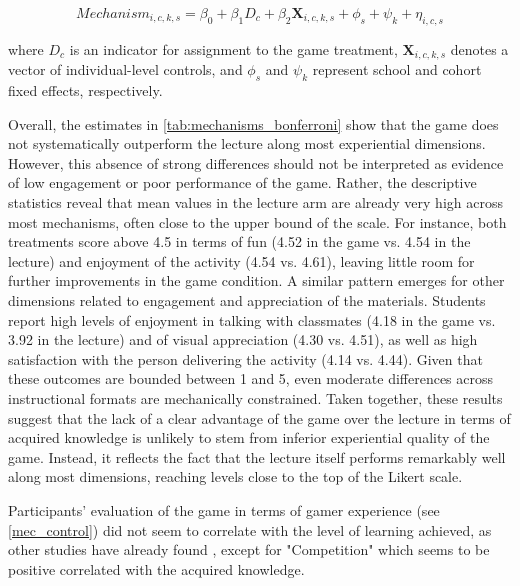 \documentclass[preprint,12pt]{elsarticle}
\begin{document}
\[ Mechanism_{i,c,k,s} = \beta_0 + \beta_1 D_c + \beta_2\textbf{X}_{i,c,k,s} + \phi_s + \psi_k + \eta_{i,c,s} \]

where $D_c$ is an indicator for assignment to the game treatment, $\mathbf{X}_{i,c,k,s}$ denotes a vector of individual-level controls, and $\phi_s$ and $\psi_k$ represent school and cohort fixed effects, respectively.



Overall, the estimates in \ref{tab:mechanisms_bonferroni} show that the game does not systematically outperform the lecture along most experiential dimensions. However, this absence of strong differences should not be interpreted as evidence of low engagement or poor performance of the game. Rather, the descriptive statistics reveal that mean values in the lecture arm are already very high across most mechanisms, often close to the upper bound of the scale. For instance, both treatments score above 4.5 in terms of fun (4.52 in the game vs. 4.54 in the lecture) and enjoyment of the activity (4.54 vs. 4.61), leaving little room for further improvements in the game condition.
A similar pattern emerges for other dimensions related to engagement and appreciation of the materials. Students report high levels of enjoyment in talking with classmates (4.18 in the game vs. 3.92 in the lecture) and of visual appreciation (4.30 vs. 4.51), as well as high satisfaction with the person delivering the activity (4.14 vs. 4.44). Given that these outcomes are bounded between 1 and 5, even moderate differences across instructional formats are mechanically constrained.
Taken together, these results suggest that the lack of a clear advantage of the game over the lecture in terms of acquired knowledge is unlikely to stem from inferior experiential quality of the game. Instead, it reflects the fact that the lecture itself performs remarkably well along most dimensions, reaching levels close to the top of the Likert scale.


Participants' evaluation of the game in terms of gamer experience (see \ref{mec_control}) did not seem to correlate with the level of learning achieved, as other studies have already found \cite{garcia2025evaluating}, except for "Competition" which seems to be positive correlated with the acquired knowledge.

\end{document}
